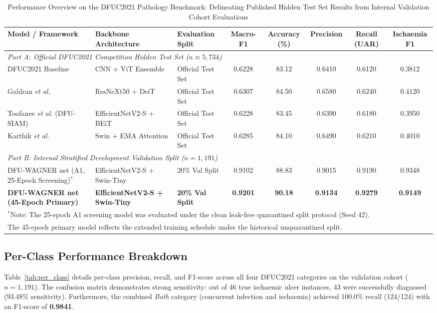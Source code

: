 \documentclass[journal]{IEEEtran}
\begin{document}
\begin{table}[t]
\centering
\caption{Performance Overview on the DFUC2021 Pathology Benchmark: Delineating Published Hidden Test Set Results from Internal Validation Cohort Evaluations}
\label{tab:dfuc_comparison}
\begin{tabular}{lllccccc}
\toprule
\textbf{Model / Framework} & \textbf{Backbone Architecture} & \textbf{Evaluation Split} & \textbf{Macro-F1} & \textbf{Accuracy (\%)} & \textbf{Precision} & \textbf{Recall (UAR)} & \textbf{Ischaemia F1} \\
\midrule
\multicolumn{8}{l}{\textit{Part A: Official DFUC2021 Competition Hidden Test Set ($n \approx 5,734$)}} \\
DFUC2021 Baseline \cite{cassidy2021diabetic} & CNN + ViT Ensemble & Official Test Set & 0.6228 & 83.12 & 0.6410 & 0.6120 & 0.3812 \\
Galdran \textit{et al.} \cite{galdran2021convolutional} & ResNeXt50 + DeiT & Official Test Set & 0.6307 & 84.50 & 0.6580 & 0.6240 & 0.4120 \\
Toofanee \textit{et al.} (DFU-SIAM) \cite{toofanee2023dfu} & EfficientNetV2-S + BEiT & Official Test Set & 0.6228 & 83.45 & 0.6390 & 0.6180 & 0.3950 \\
Karthik \textit{et al.} \cite{karthik2025attention} & Swin + EMA Attention & Official Test Set & 0.6285 & 84.10 & 0.6490 & 0.6210 & 0.4010 \\
\midrule
\multicolumn{8}{l}{\textit{Part B: Internal Stratified Development Validation Split ($n = 1,191$)}} \\
DFU-WAGNER net (A1, 25-Epoch Screening)$^*$ & EfficientNetV2-S + Swin-Tiny & 20\% Val Split & 0.9102 & 88.83 & 0.9015 & 0.9190 & 0.9348 \\
\textbf{DFU-WAGNER net (45-Epoch Primary)} & \textbf{EfficientNetV2-S + Swin-Tiny} & \textbf{20\% Val Split} & \textbf{0.9201} & \textbf{90.18} & \textbf{0.9134} & \textbf{0.9279} & \textbf{0.9149} \\
\bottomrule
\multicolumn{8}{l}{\footnotesize $^*$Note: The 25-epoch A1 screening model was evaluated under the clean leak-free quarantined split protocol (Seed 42).} \\
\multicolumn{8}{l}{\footnotesize The 45-epoch primary model reflects the extended training schedule under the historical unquarantined split.} \\
\end{tabular}
\end{table}

\subsection{Per-Class Performance Breakdown}
Table~\ref{tab:per_class} details per-class precision, recall, and F1-score across all four DFUC2021 categories on the validation cohort ($n = 1,191$). The confusion matrix demonstrates strong sensitivity: out of 46 true ischaemic ulcer instances, 43 were successfully diagnosed (93.48\% sensitivity). Furthermore, the combined \textit{Both} category (concurrent infection and ischaemia) achieved 100.0\% recall (124/124) with an F1-score of \textbf{0.9841}.
\end{document}
